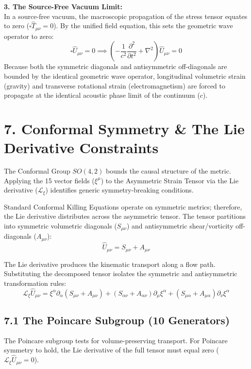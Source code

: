 \textbf{3. The Source-Free Vacuum Limit:} \\
In a source-free vacuum, the macroscopic propagation of the stress tensor equates to zero ($\square \hat{T}_{\mu\nu} = 0$). By the unified field equation, this sets the geometric wave operator to zero: 
\begin{equation}
    \square \hat{U}_{\mu\nu} = 0 \implies \left( -\frac{1}{c^2}\frac{\partial^2}{\partial t^2} + \nabla^2 \right) \hat{U}_{\mu\nu} = 0
\end{equation}
Because both the symmetric diagonals and antisymmetric off-diagonals are bounded by the identical geometric wave operator, longitudinal volumetric strain (gravity) and transverse rotational strain (electromagnetism) are forced to propagate at the identical acoustic phase limit of the continuum ($c$).
\section*{7. Conformal Symmetry \& The Lie Derivative Constraints}
The Conformal Group $SO(4,2)$ bounds the causal structure of the metric. Applying the 15 vector fields ($\xi^\mu$) to the Asymmetric Strain Tensor via the Lie derivative ($\mathcal{L}_\xi$) identifies generic symmetry-breaking conditions.

Standard Conformal Killing Equations operate on symmetric metrics; therefore, the Lie derivative distributes across the asymmetric tensor. The tensor partitions into symmetric volumetric diagonals ($S_{\mu\nu}$) and antisymmetric shear/vorticity off-diagonals ($A_{\mu\nu}$):
\begin{equation}
    \hat{U}_{\mu\nu} = S_{\mu\nu} + A_{\mu\nu}
\end{equation}

The Lie derivative produces the kinematic transport along a flow path. Substituting the decomposed tensor isolates the symmetric and antisymmetric transformation rules:
\begin{equation}
    \mathcal{L}_\xi \hat{U}_{\mu\nu} = \xi^\alpha \partial_\alpha (S_{\mu\nu} + A_{\mu\nu}) + (S_{\alpha\nu} + A_{\alpha\nu}) \partial_\mu \xi^\alpha + (S_{\mu\alpha} + A_{\mu\alpha}) \partial_\nu \xi^\alpha \label{eq:lie_derivative_base}
\end{equation}

\subsection*{7.1 The Poincare Subgroup (10 Generators)}
The Poincare subgroup tests for volume-preserving transport. For Poincare symmetry to hold, the Lie derivative of the full tensor must equal zero ($\mathcal{L}_\xi \hat{U}_{\mu\nu} = 0$).

